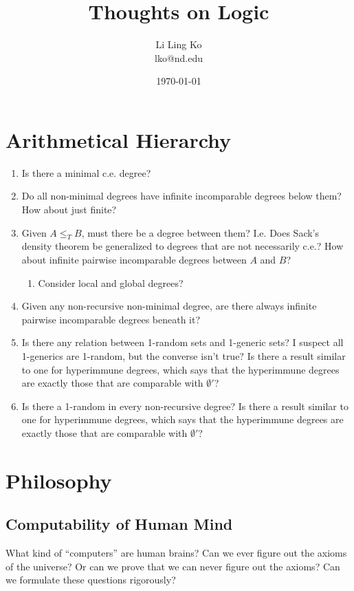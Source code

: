 \documentclass{article}
\begin{document}
\title{Thoughts on Logic}
\author{Li Ling Ko\\ lko@nd.edu}
\date{\today}
\maketitle

\section{Arithmetical Hierarchy}
  \begin{enumerate}
    \item Is there a minimal c.e. degree?

    \item Do all non-minimal degrees have infinite incomparable degrees
      below them? How about just finite?

    \item Given $A\leq_T B$, must there be a degree between them? I.e. Does
      Sack's density theorem be generalized to degrees that are not
      necessarily c.e.? How about infinite pairwise incomparable degrees
      between $A$ and $B$?

      \begin{enumerate}
        \item Consider local and global degrees?
      \end{enumerate}

    \item Given any non-recursive non-minimal degree, are there always
      infinite pairwise incomparable degrees beneath it?

    \item Is there any relation between 1-random sets and 1-generic sets? I
      suspect all 1-generics are 1-random, but the converse isn't true? Is
      there a result similar to one for hyperimmune degrees, which says
      that the hyperimmune degrees are exactly those that are comparable
      with $\emptyset'$?

    \item Is there a 1-random in every non-recursive degree? Is there a
      result similar to one for hyperimmune degrees, which says that the
      hyperimmune degrees are exactly those that are comparable with
      $\emptyset'$?
  \end{enumerate}

\section{Philosophy}
  \subsection{Computability of Human Mind}
    What kind of ``computers'' are human brains? Can we ever figure out the
    axioms of the universe? Or can we prove that we can never figure out
    the axioms? Can we formulate these questions rigorously?
\end{document}
